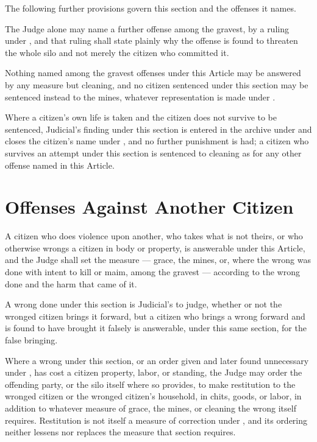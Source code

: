 The following further provisions govern this section and the offenses it names.

\begin{clauses}
\setcounter{enumi}{8}
\item The Judge alone may name a further offense among the gravest, by a ruling under , and that ruling shall state plainly why the offense is found to threaten the whole silo and not merely the citizen who committed it.
\item Nothing named among the gravest offenses under this Article may be answered by any measure but cleaning, and no citizen sentenced under this section may be sentenced instead to the mines, whatever representation is made under .
\item Where a citizen's own life is taken and the citizen does not survive to be sentenced, Judicial's finding under this section is entered in the archive under  and closes the citizen's name under , and no further punishment is had; a citizen who survives an attempt under this section is sentenced to cleaning as for any other offense named in this Article.
\end{clauses}

\section{Offenses Against Another Citizen}
\label{sec:crimes:offenses-against-another-citizen}

A citizen who does violence upon another, who takes what is not theirs, or who otherwise wrongs a citizen in body or property, is answerable under this Article, and the Judge shall set the measure --- grace, the mines, or, where the wrong was done with intent to kill or maim, among the gravest --- according to the wrong done and the harm that came of it.

\begin{clauses}
\item A wrong done under this section is Judicial's to judge, whether or not the wronged citizen brings it forward, but a citizen who brings a wrong forward and is found to have brought it falsely is answerable, under this same section, for the false bringing.
\item Where a wrong under this section, or an order given and later found unnecessary under , has cost a citizen property, labor, or standing, the Judge may order the offending party, or the silo itself where  so provides, to make restitution to the wronged citizen or the wronged citizen's household, in chits, goods, or labor, in addition to whatever measure of grace, the mines, or cleaning the wrong itself requires. Restitution is not itself a measure of correction under , and its ordering neither lessens nor replaces the measure that section requires.
\end{clauses}


